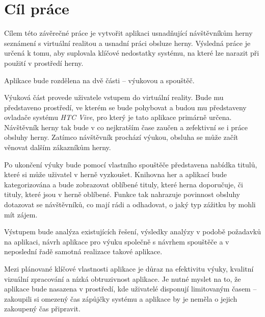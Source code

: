 \chapter{Cíl práce}\label{cuxedl-pruxe1ce}

Cílem této závěrečné práce je vytvořit aplikaci usnadňující návštěvníkům
herny seznámení s virtuální realitou a usnadní práci obsluze herny.
Výsledná práce je určená k tomu, aby suplovala klíčové nedostatky
systému, na které lze narazit při použití v prostředí herny.

Aplikace bude rozdělena na dvě části -- výukovou a spouštěč.

Výuková část provede uživatele vstupem do virtuální reality. Bude mu
představeno prostředí, ve kterém se bude pohybovat a budou mu
představeny ovladače systému \emph{HTC Vive}, pro který je tato aplikace
primárně určena. Návštěvník herny tak bude v co nejkratším čase zaučen a
zefektivní se i práce obsluhy herny. Zatímco návštěvník prochází výukou,
obsluha se může začít věnovat dalším zákazníkům herny.

Po ukončení výuky bude pomocí vlastního spouštěče představena nabídka
titulů, které si může uživatel v herně vyzkoušet. Knihovna her a
aplikací bude kategorizována a bude zobrazovat oblíbené tituly, které
herna doporučuje, či tituly, které jsou v herně oblíbené. Funkce tak
nahrazuje povinnost obsluhy dotazovat se návštěvníků, co mají rádi a
odhadovat, o jaký typ zážitku by mohli mít zájem.

Výstupem bude analýza existujících řešení, výsledky analýzy v podobě
požadavků na aplikaci, návrh aplikace pro výuku společně s návrhem
spouštěče a v neposlední řadě samotná realizace takové aplikace.

Mezi plánované klíčové vlastnosti aplikace je důraz na efektivitu výuky,
kvalitní vizuální zpracování a nízká obtruzivnost aplikace. Je nutné
myslet na to, že aplikace bude nasazena v prostředí, kde uživatelé
disponují limitovaným časem -- zakoupili si omezený čas zápůjčky systému
a aplikace by je neměla o jejich zakoupený čas připravit.
